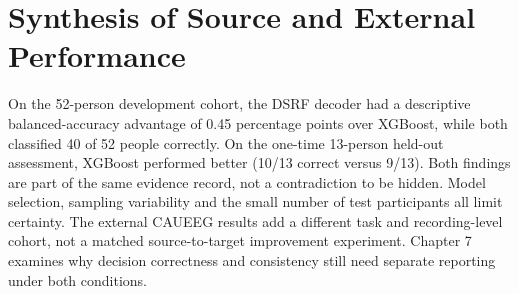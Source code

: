 \section{Synthesis of Source and External Performance}
On the 52-person development cohort, the DSRF decoder had a descriptive balanced-accuracy advantage of 0.45 percentage points over XGBoost, while both classified 40 of 52 people correctly. On the one-time 13-person held-out assessment, XGBoost performed better (10/13 correct versus 9/13). Both findings are part of the same evidence record, not a contradiction to be hidden. Model selection, sampling variability and the small number of test participants all limit certainty. The external CAUEEG results add a different task and recording-level cohort, not a matched source-to-target improvement experiment. Chapter 7 examines why decision correctness and consistency still need separate reporting under both conditions.
